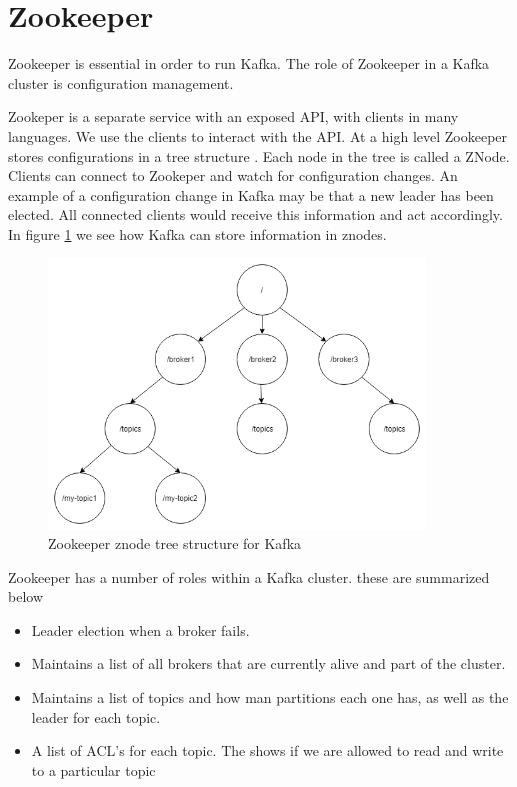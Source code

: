 \section{Zookeeper}

Zookeeper is essential in order to run Kafka. The role of Zookeeper in a Kafka cluster is configuration management. 
	
Zookeper is a separate service with an exposed API, with clients in many languages. We use the clients to interact with the API. At a high level Zookeeper stores configurations in a tree structure \cite{hunt2010zookeeper}. Each node in the tree is called a ZNode. Clients can connect to Zookeper and watch for configuration changes. An example of a configuration change in Kafka may be that a new leader has been elected. All connected clients would receive this information and act accordingly. In figure \ref{fig:zookeeper-znodes} we see how Kafka can store information in znodes.

\begin{figure}[H]
  \centering
  \includegraphics[scale=0.5,width=100mm]{./images/zookeeper-znodes.png}
  \caption{Zookeeper znode tree structure for Kafka}
  \label{fig:zookeeper-znodes}
\end{figure}

Zookeeper has a number of roles within a Kafka cluster. these are summarized below

\begin{itemize}
  \item Leader election when a broker fails.
  \item Maintains a list of all brokers that are currently alive and part of the cluster.
  \item Maintains a list of topics and how man partitions each one has, as well as the leader for each topic.
  \item A list of ACL's for each topic. The shows if we are allowed to read and write to a particular topic
\end{itemize}